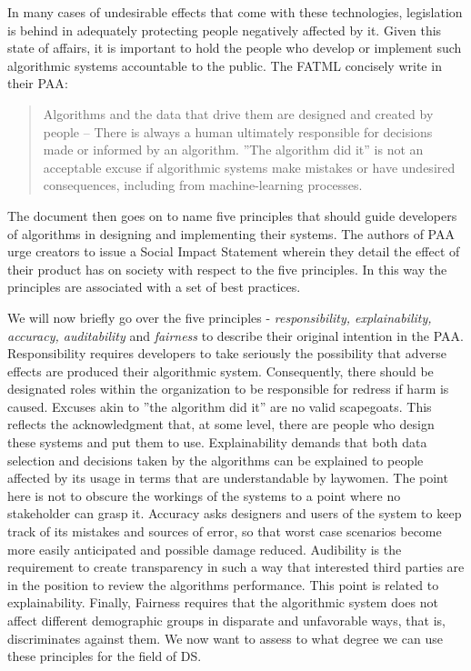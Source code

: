 \documentclass{article}
\begin{document}
In many cases of undesirable effects that come with these technologies, legislation is behind in adequately protecting people negatively affected by it.
Given this state of affairs, it is important to hold the people who develop or implement such algorithmic systems accountable to the public. The FATML concisely write in their PAA\cite{principles}: 
\begin{quote}
Algorithms and the data that drive them are designed and created by people -- There is always a human ultimately responsible for decisions made or informed by an algorithm. ''The algorithm did it'' is not an acceptable excuse if algorithmic systems make mistakes or have undesired consequences, including from machine-learning processes.
\end{quote}

The document then goes on to name five principles that should guide developers of algorithms in designing and implementing their systems. The authors of PAA urge creators to issue a Social Impact Statement wherein they detail the effect of their product has on society with respect to the five principles. In this way the principles are associated with a set of best practices.

We will now briefly go over the five principles - \emph{responsibility, explainability, accuracy, auditability} and \emph{fairness} to describe their original intention in the PAA.
Responsibility requires developers to take seriously the possibility that adverse effects are produced their algorithmic system. Consequently, there should be designated roles within the organization to be responsible for redress if harm is caused. Excuses akin to ''the algorithm did it'' are no valid scapegoats. This reflects the acknowledgment that, at some level, there are people who design these systems and put them to use.
Explainability demands that both data selection and decisions taken by the algorithms can be explained to people affected by its usage in terms that are understandable by laywomen. The point here is not to obscure the workings of the systems to a point where no stakeholder can grasp it.
Accuracy asks designers and users of the system to keep track of its mistakes and sources of error, so that worst case scenarios become more easily anticipated and possible damage reduced.
Audibility is the requirement to create transparency in such a way that interested third parties are in the position to review the algorithms performance. This point is related to explainability.
Finally, Fairness requires that the algorithmic system does not affect different demographic groups in disparate and unfavorable ways, that is, discriminates against them.
We now want to assess to what degree we can use these principles for the field of DS.
\end{document}
